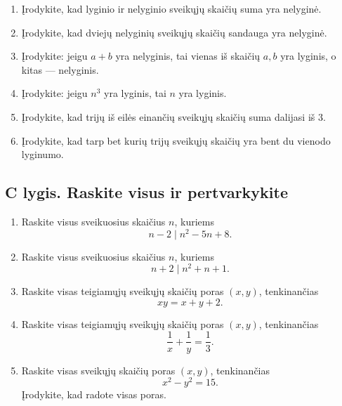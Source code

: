 \documentclass[11pt,a4paper]{scrartcl}
\begin{document}
\begin{enumerate}
    \renewcommand{\labelenumi}{\textbf{\theenumi.}}
    \setcounter{enumi}{5}

    \item Įrodykite, kad lyginio ir nelyginio sveikųjų skaičių suma yra
    nelyginė.

    \item Įrodykite, kad dviejų nelyginių sveikųjų skaičių sandauga yra
    nelyginė.

    \item Įrodykite: jeigu $a+b$ yra nelyginis, tai vienas iš skaičių
    $a,b$ yra lyginis, o kitas --- nelyginis.

    \item Įrodykite: jeigu $n^3$ yra lyginis, tai $n$ yra lyginis.

    \item Įrodykite, kad trijų iš eilės einančių sveikųjų skaičių suma
    dalijasi iš $3$.

    \item Įrodykite, kad tarp bet kurių trijų sveikųjų skaičių yra bent
    du vienodo lyginumo.
\end{enumerate}

\subsection{C lygis. Raskite visus ir pertvarkykite}

\begin{enumerate}
    \renewcommand{\labelenumi}{\textbf{\theenumi.}}
    \setcounter{enumi}{11}

    \item Raskite visus sveikuosius skaičius $n$, kuriems
    \[
    n-2\mid n^2-5n+8.
    \]

    \item Raskite visus sveikuosius skaičius $n$, kuriems
    \[
    n+2\mid n^2+n+1.
    \]

    \item Raskite visas teigiamųjų sveikųjų skaičių poras $(x,y)$,
    tenkinančias
    \[
    xy=x+y+2.
    \]

    \item Raskite visas teigiamųjų sveikųjų skaičių poras $(x,y)$,
    tenkinančias
    \[
    \frac1x+\frac1y=\frac13.
    \]

    \item Raskite visas sveikųjų skaičių poras $(x,y)$, tenkinančias
    \[
    x^2-y^2=15.
    \]
    Įrodykite, kad radote visas poras.
\end{enumerate}
\end{document}

